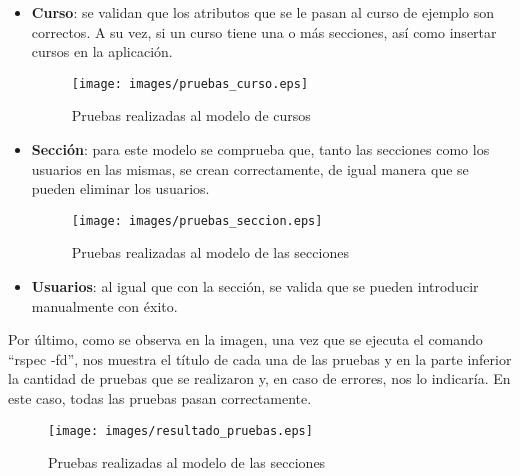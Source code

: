 \begin{itemize}
    \item \textbf{Curso}: se validan que los atributos que se le pasan al curso de ejemplo son correctos. A su vez, si un curso tiene una o más secciones, así como insertar cursos en la aplicación.
    \begin{figure}[!th]
    \begin{center}
    \texttt{[image: images/pruebas\_curso.eps]}
    \caption{Pruebas realizadas al modelo de cursos}
    \label{fig:23}
    \end{center}
    \end{figure}
    
    \item \textbf{Sección}: para este modelo se comprueba que, tanto las secciones como los usuarios en las mismas, se crean correctamente, de igual manera que se pueden eliminar los usuarios.
    \begin{figure}[!th]
    \begin{center}
    \texttt{[image: images/pruebas\_seccion.eps]}
    \caption{Pruebas realizadas al modelo de las secciones}
    \label{fig:24}
    \end{center}
    \end{figure}
    \item \textbf{Usuarios}: al igual que con la sección, se valida que se pueden introducir manualmente con éxito.
\end{itemize}

\newpage
Por último, como se observa en la imagen, una vez que se ejecuta el comando ``rspec -fd'', nos muestra el título de cada una de las pruebas y en la parte inferior la cantidad de pruebas que se realizaron
y, en caso de errores, nos lo indicaría. En este caso, todas las pruebas pasan correctamente.

\begin{figure}[!th]
\begin{center}
\texttt{[image: images/resultado\_pruebas.eps]}
\caption{Pruebas realizadas al modelo de las secciones}
\label{fig:25}
\end{center}
\end{figure}